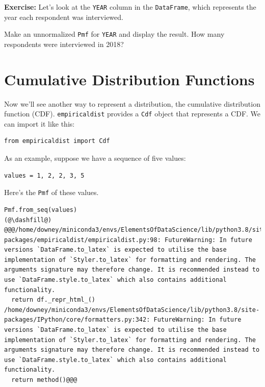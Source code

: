 \textbf{Exercise:} Let's look at the \passthrough{\lstinline!YEAR!}
column in the \passthrough{\lstinline!DataFrame!}, which represents the
year each respondent was interviewed.

Make an unnormalized \passthrough{\lstinline!Pmf!} for
\passthrough{\lstinline!YEAR!} and display the result. How many
respondents were interviewed in 2018?

\hypertarget{cumulative-distribution-functions}{%
\section{Cumulative Distribution
Functions}\label{cumulative-distribution-functions}}

Now we'll see another way to represent a distribution, the cumulative
distribution function (CDF). \passthrough{\lstinline!empiricaldist!}
provides a \passthrough{\lstinline!Cdf!} object that represents a CDF.
We can import it like this:

\begin{lstlisting}[]
from empiricaldist import Cdf
\end{lstlisting}

As an example, suppose we have a sequence of five values:

\begin{lstlisting}[]
values = 1, 2, 2, 3, 5  
\end{lstlisting}

Here's the \passthrough{\lstinline!Pmf!} of these values.

\begin{lstlisting}[]
Pmf.from_seq(values)
(@\dashfill@)
@@@/home/downey/miniconda3/envs/ElementsOfDataScience/lib/python3.8/site-packages/empiricaldist/empiricaldist.py:98: FutureWarning: In future versions `DataFrame.to_latex` is expected to utilise the base implementation of `Styler.to_latex` for formatting and rendering. The arguments signature may therefore change. It is recommended instead to use `DataFrame.style.to_latex` which also contains additional functionality.
  return df._repr_html_()
/home/downey/miniconda3/envs/ElementsOfDataScience/lib/python3.8/site-packages/IPython/core/formatters.py:342: FutureWarning: In future versions `DataFrame.to_latex` is expected to utilise the base implementation of `Styler.to_latex` for formatting and rendering. The arguments signature may therefore change. It is recommended instead to use `DataFrame.style.to_latex` which also contains additional functionality.
  return method()@@@
\end{lstlisting}

